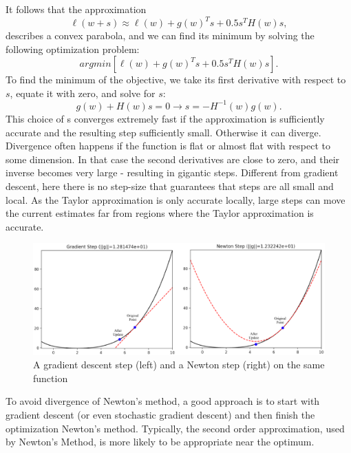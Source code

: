 It follows that the approximation
\begin{equation}
	\label{equ:newton_approx}
	\ell(w+s) \approx \ell(w) + g(w)^{T}s + 0.5s^{T}H(w)s,
\end{equation}
describes a convex parabola, and we can find its minimum by solving the following 
optimization problem: 
\begin{equation}
	\label{equ:newton_opt}
	argmin[\ell(w) + g(w)^{T}s + 0.5s^{T}H(w)s].
\end{equation}
To find the minimum of the objective, we take its first derivative with respect to $s$,
equate it with zero, and solve for $s$:
\begin{equation}
	\label{equ:newton_opt_solved}
	g(w) + H(w)s = 0 \to s = -H^{-1}(w)g(w).
\end{equation}
This choice of s converges extremely fast if the approximation is sufficiently accurate and the 
resulting step sufficiently small.
Otherwise it can diverge. Divergence often happens if the function is flat or almost flat with 
respect to some dimension. In that case the second derivatives are close to zero, and their
inverse becomes very large - resulting in gigantic steps.
Different from gradient descent, here there is no step-size that guarantees that steps are 
all small and local. 
As the Taylor approximation is only accurate locally, large steps can move the current estimates
far from regions where the Taylor approximation is accurate. 
\begin{figure}[htb] 
	\label{fig:gradient_newton}
	\centering
	\includegraphics[width=\textwidth]{figures/gradient_newton}
	\caption{A gradient descent step (left) and a Newton step (right) on the same function}
\end{figure}
To avoid divergence of Newton's method, a good approach is to start with gradient descent 
(or even stochastic gradient descent) and then finish the optimization Newton's method.
Typically, the second order approximation, used by Newton's Method, is more likely to be
appropriate near the optimum.

